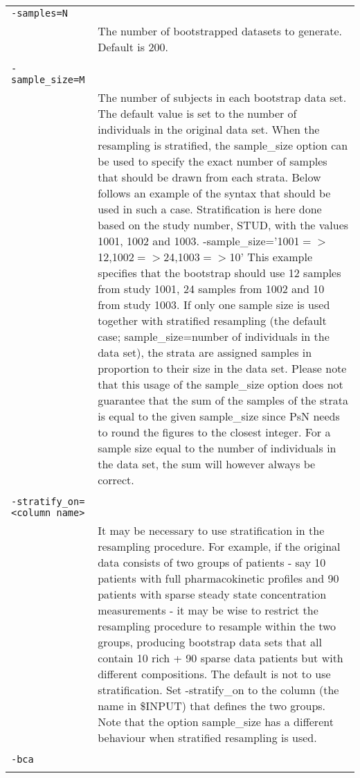 \documentclass[a4paper,12pt]{article}
\begin{document}
\begin{longtable}{p{1in}p{4in}}
\verb|-samples=N| & \\
\nopagebreak
 & The number of bootstrapped datasets to generate. Default is 200. \\
\\
\verb|-sample_size=M| & \\
\nopagebreak
 & The number of subjects in each bootstrap data set. The default       value is set to the number of individuals in the original data set. When the resampling is stratified, the sample\_size option can be used to specify the exact number of samples that should be drawn from each strata. Below follows an example of the syntax that should be used in such a case. Stratification is here done based on the study number, STUD, with the values 1001, 1002 and 1003.  -sample\_size='1001$=>$12,1002$=>$24,1003$=>$10'                          This example specifies that the bootstrap should use 12 samples from study 1001, 24 samples from 1002 and 10 from study 1003. If only one sample size is used together with stratified resampling (the default case; sample\_size=number of individuals in the data set), the strata are assigned samples in proportion to their size in the data set. Please note that this usage of the sample\_size option does not guarantee that the sum of the samples of the strata is equal to the given sample\_size since PsN needs to round the figures to the closest integer. For a sample size equal to the number of individuals in the data set, the sum will however always be correct. \\
\\
\verb|-stratify_on=<column name>| & \\
\nopagebreak
 & It may be necessary to use stratification in the resampling procedure. For example, if the original data consists of two groups of patients - say 10 patients with full pharmacokinetic profiles and 90 patients with sparse steady state concentration measurements - it may be wise to restrict the resampling procedure to resample within the two groups, producing bootstrap data sets that all contain 10 rich + 90 sparse data patients but with different compositions. The default is not to use stratification. Set -stratify\_on to the column (the name in \$INPUT) that defines the two groups. Note that the option sample\_size has a different behaviour when stratified resampling is used. \\
\\
\verb|-bca| & \\
\nopagebreak

\end{longtable}
\end{document}
